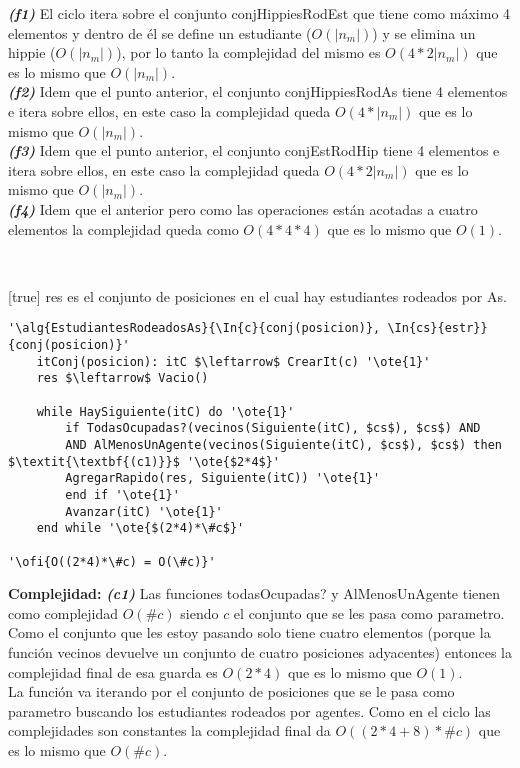 \textit{\textbf{(f1)}} El ciclo itera sobre el conjunto conjHippiesRodEst que tiene como máximo 4 elementos y dentro de él se define un estudiante ($O(|n_m|)$) y se elimina un hippie ($O(|n_m|)$), por lo tanto la complejidad del mismo es $O(4*2|n_m|)$ que es lo mismo que $O(|n_m|)$. \\
\textit{\textbf{(f2)}} Idem que el punto anterior, el conjunto conjHippiesRodAs tiene 4 elementos e itera sobre ellos, en este caso la complejidad queda $O(4*|n_m|)$ que es lo mismo que  $O(|n_m|)$. \\
\textit{\textbf{(f3)}} Idem que el punto anterior, el conjunto conjEstRodHip tiene 4 elementos e itera sobre ellos, en este caso la complejidad queda $O(4*2|n_m|)$ que es lo mismo que  $O(|n_m|)$. \\
\textit{\textbf{(f4)}} Idem que el anterior pero como las operaciones están acotadas a cuatro elementos la complejidad queda como $O(4*4*4)$ que es lo mismo que $O(1)$.

~


[true]
{res es el conjunto de posiciones en el cual hay estudiantes rodeados por As.}

\begin{lstlisting}[mathescape]
'\alg{EstudiantesRodeadosAs}{\In{c}{conj(posicion)}, \In{cs}{estr}}{conj(posicion)}'
	itConj(posicion): itC $\leftarrow$ CrearIt(c) '\ote{1}'
	res $\leftarrow$ Vacio()

	while HaySiguiente(itC) do '\ote{1}'
		if TodasOcupadas?(vecinos(Siguiente(itC), $cs$), $cs$) AND
		AND AlMenosUnAgente(vecinos(Siguiente(itC), $cs$), $cs$) then $\textit{\textbf{(c1)}}$ '\ote{$2*4$}'
		AgregarRapido(res, Siguiente(itC)) '\ote{1}'
		end if '\ote{1}'
		Avanzar(itC) '\ote{1}'
	end while '\ote{$(2*4)*\#c$}'

'\ofi{O((2*4)*\#c) = O(\#c)}'
\end{lstlisting}

\textbf{Complejidad:} \textit{\textbf{(c1)}} Las funciones todasOcupadas? y AlMenosUnAgente tienen como complejidad $O(\#c)$ siendo $c$ el conjunto que se les pasa como parametro. Como el conjunto que les estoy pasando solo tiene cuatro elementos (porque la función vecinos devuelve un conjunto de cuatro posiciones adyacentes) entonces la complejidad final de esa guarda es $O(2*4)$ que es lo mismo que $O(1)$. \\
La función va iterando por el conjunto de posiciones que se le pasa como parametro buscando los estudiantes rodeados por agentes. Como en el ciclo las complejidades son constantes la complejidad final da $O((2*4+8)*\#c)$ que es lo mismo que $O(\#c)$.


